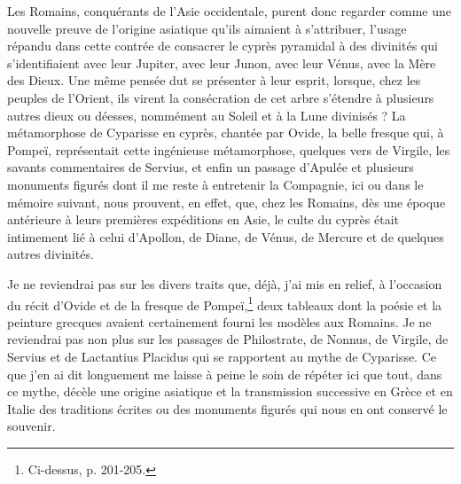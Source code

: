 \documentclass{article}
\begin{document}
Les Romains, conquérants de l'Asie occidentale, purent donc regarder comme une nouvelle preuve de l'origine asiatique qu'ils aimaient à s'attribuer, l'usage répandu dans cette contrée de consacrer le cyprès pyramidal à des divinités qui s'identifiaient avec leur Jupiter, avec leur Junon, avec leur Vénus, avec la Mère des Dieux. Une même pensée dut se présenter à leur esprit, lorsque, chez les peuples de l'Orient, ils virent la consécration de cet arbre s'étendre à plusieurs autres dieux ou déesses, nommément au Soleil et à la Lune divinisés ? La métamorphose de Cyparisse en cyprès, chantée par Ovide, la belle fresque qui, à Pompeï, représentait cette ingénieuse métamorphose, quelques vers de Virgile, les savants commentaires de Servius, et enfin un passage d'Apulée et plusieurs monuments figurés dont il me reste à entretenir la Compagnie, ici ou dans le mémoire suivant, nous prouvent, en effet, que, chez les Romains, dès une époque antérieure à leurs premières expéditions en Asie, le culte du cyprès était intimement lié à celui d'Apollon, de Diane, de Vénus, de Mercure et de quelques autres divinités.

Je ne reviendrai pas sur les divers traits que, déjà, j'ai mis en relief, à l'occasion du récit d'Ovide et de la fresque de Pompeï,\footnote{Ci-dessus, p. 201-205.} deux tableaux dont la poésie et la peinture grecques avaient certainement fourni les modèles aux Romains. Je ne reviendrai pas non plus sur les passages de Philostrate, de Nonnus, de Virgile, de Servius et de Lactantius Placidus qui se rapportent au mythe de Cyparisse. Ce que j'en ai dit longuement me laisse à peine le soin de répéter ici que tout, dans ce mythe, décèle une origine asiatique et la transmission successive en Grèce et en Italie des traditions écrites ou des monuments figurés qui nous en ont conservé le souvenir.
\end{document}
